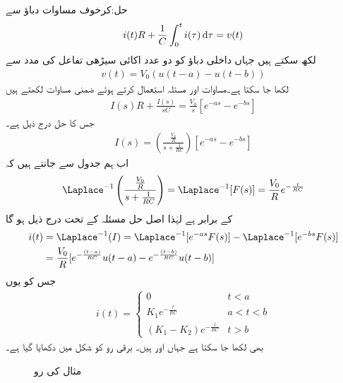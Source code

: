 حل:کرخوف مساوات دباؤ سے 
\begin{align*}
i(t)R+\frac{1}{C}\int_{0}^{t} i(\tau)\dif \tau=v(t)
\end{align*}
لکھ سکتے ہیں جہاں داخلی دباؤ کو دو عدد اکائی سیڑھی تفاعل کی مدد سے 
\begin{align*}
v(t)=V_0(u(t-a)-u(t-b))
\end{align*}
لکھا جا سکتا ہے۔مساوات  اور مسئلہ  استعمال کرتے ہوئے  ضمنی مساوات لکھتے ہیں
\begin{align*}
I(s)R+\frac{I(s)}{sC}=\frac{V_0}{s}[e^{-as}-e^{-bs}]
\end{align*}
جس کا حل درج ذیل ہے۔
\begin{align*}
I(s)=\left(\frac{\frac{V_0}{R}}{s+\frac{1}{RC}}\right)[e^{-as}-e^{-bs}]
\end{align*}
اب ہم جدول  سے جانتے ہیں کہ
\begin{align*}
\Laplace^{-1}\left(\frac{\frac{V_0}{R}}{s+\frac{1}{RC}}\right)=\Laplace^{-1}[F(s)]=\frac{V_0}{R}e^{-\frac{t}{RC}}
\end{align*}
کے برابر ہے لہٰذا اصل حل مسئلہ  کے تحت  درج ذیل ہو گا
\begin{align*}
i(t)&=\Laplace^{-1}(I)=\Laplace^{-1}[e^{-as}F(s)]-\Laplace^{-1}[e^{-bs}F(s)]\\
&=\frac{V_0}{R}[e^{-\frac{(t-a)}{RC}}u(t-a)-e^{-\frac{(t-b)}{RC}}u(t-b)]
\end{align*}
جس کو یوں
\begin{align*}
i(t)=
\begin{cases}
0&t<a\\
K_1e^{-\frac{t}{RC}}& a<t<b\\
(K_1-K_2)e^{-\frac{t}{RC}} & t>b
\end{cases}
\end{align*}
بھی لکھا جا سکتا ہے جہاں  اور  ہیں۔ برقی رو  کو شکل  میں دکھایا گیا ہے۔
\begin{figure}
\centering
{}
\caption{مثال  کی رو }
\label{شکل_مثال_لاپلاس_سلسلہ_وار_دور_الف_رو}
\end{figure}
